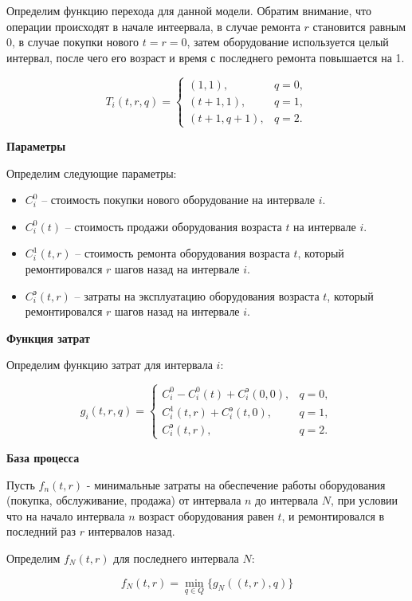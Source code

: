 Определим функцию перехода для данной модели. Обратим внимание, что операции происходят в начале интеервала, в случае ремонта $r$ становится равным 0, в случае покупки нового $t = r = 0$, затем оборудование используется целый интервал, после чего его возраст и время с последнего ремонта повышается на 1.

\[
T_i(t, r, q) = 
\begin{cases}
	(1, 1), & q = 0, \\
	(t+1, 1), & q = 1, \\
	(t+1, q+1), & q = 2.
\end{cases}
\]


\bigskip

\textbf{Параметры}

Определим следующие параметры:
\begin{itemize}[nosep]
	\item $C_i^0$ -- стоимость покупки нового оборудование на интервале $i$.
	\item $C_i^0(t)$ -- стоимость продажи оборудования возраста $t$ на интервале $i$.
	\item $C_i^1(t, r)$ -- стоимость ремонта оборудования возраста $t$, который ремонтировался $r$ шагов назад на интервале $i$.
	\item $C_i^\text{э} (t,r)$ -- затраты на эксплуатацию оборудования возраста $t$, который ремонтировался $r$ шагов назад на интервале $i$.
\end{itemize}

\bigskip

\textbf{Функция затрат}

Определим функцию затрат для интервала $i$:

\[
g_i(t, r, q) = 
\begin{cases}
	C_i^0 - C_i^0(t) + C_i^\text{э} (0,0), & q = 0, \\
	C_i^1(t,r) + C_i^\text{э} (t,0), & q = 1, \\
	C_i^\text{э} (t,r), & q = 2.
\end{cases}
\]

\textbf{База процесса}

Пусть $f_n(t, r)$ - минимальные затраты на обеспечение работы оборудования (покупка, обслуживание, продажа) от интервала $n$ до интервала $N$, при условии что на начало интервала $n$ возраст оборудования равен $t$, и ремонтировался в последний раз $r$ интервалов назад.

Определим $f_N(t, r)$ для последнего интервала $N$:

\[
\boxed{ f_N(t,r) = \min_{q \in Q} \Big\{ g_N((t,r), q) \Big\} }
\]

